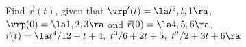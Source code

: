 {Find $\vec r(t)$, given that $\vrp'(t) = \la t^2,t,1\ra$,\\ $\vrp(0) = \la 1,2,3\ra$ and $\vec r(0) = \la 4,5,6\ra$.
}
{
$\vec r(t) = \la t^4/12+t+4,\ t^3/6+2t+5,\ t^2/2+3t+6\ra$
}

